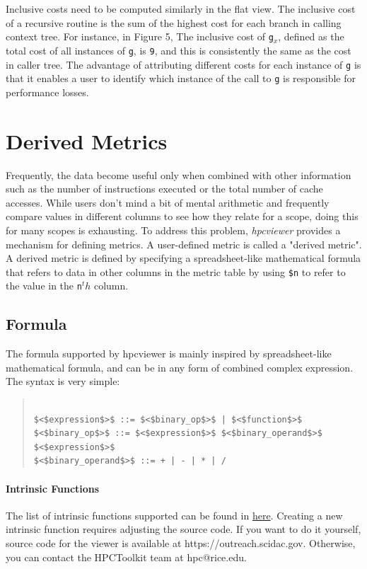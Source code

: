 \documentclass[a4paper,11pt]{article}
\begin{document}
 Inclusive costs need to be computed similarly in the flat view. The inclusive cost of a recursive routine is the sum of the highest cost for each branch in calling context tree. For instance, in Figure 5, The inclusive cost of 
\texttt{g$_x$}, defined as the total cost of all instances of 
\texttt{g}, is 
\texttt{9}, and this is consistently the same as the cost in caller tree. The advantage of attributing different costs for each instance of 
\texttt{g} is that it enables a user to identify which instance of the call to 
\texttt{g} is responsible for performance losses.  

\section{Derived Metrics}

 Frequently, the data become useful only when combined with other information such as the number of instructions executed or  the total number of cache accesses.  While users don't mind a bit of mental arithmetic and frequently compare values in different  columns to see how they relate for a scope, doing this for many scopes is exhausting.  To address this problem, \textit{hpcviewer} provides a mechanism for defining metrics.  A user-defined metric is called a "derived metric". A derived metric is defined by specifying a spreadsheet-like mathematical formula that  refers to data in other columns in the metric table by using 
\texttt{\$n} to refer to the value in the 
\texttt{n}$^th$ column. 

\subsection{Formula}

 The formula supported by hpcviewer is mainly inspired by spreadsheet-like mathematical formula, and can be in any form of combined complex expression. The syntax is very simple: 
\begin{quotation}
\begin{verbatim}

$<$expression$>$ ::= $<$binary_op$>$ | $<$function$>$ 
$<$binary_op$>$ ::= $<$expression$>$ $<$binary_operand$>$ $<$expression$>$
$<$binary_operand$>$ ::= + | - | * | /
 \end{verbatim}
\end{quotation}

\paragraph{Intrinsic Functions} The list of intrinsic functions supported can be found in \href{functions.html}{here}. Creating a new intrinsic function requires adjusting the source code. If you want to do it yourself, source code for the viewer is available at https://outreach.scidac.gov. Otherwise, you can contact the HPCToolkit team at hpc@rice.edu.  
\end{document}
